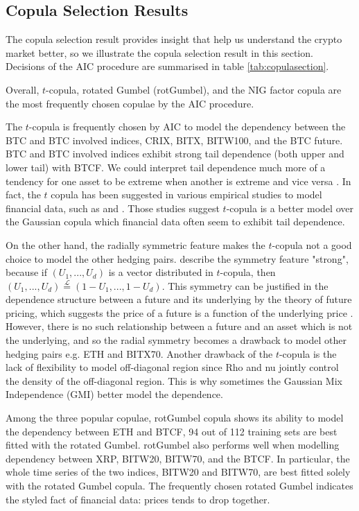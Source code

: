 \subsection{Copula Selection Results}\label{sec: copula results}
The copula selection result provides insight that help us understand the crypto market better, so
we illustrate the copula selection result in this section.
Decisions of the AIC procedure are summarised in table \ref{tab:copulasection}. \medskip

Overall, $t$-copula, rotated Gumbel (rotGumbel), and the NIG factor copula are the most frequently chosen copulae by the AIC procedure. \medskip

The $t$-copula is frequently chosen by AIC to model the dependency between the BTC and BTC involved indices, CRIX, BITX, BITW100, and the BTC future.
BTC and BTC involved indices exhibit strong tail dependence (both upper and lower tail) with BTCF.
We could interpret tail dependence much more of a tendency for one asset to be extreme when another is extreme and vice versa \citep{McNeil2015}.
In fact, the $t$ copula has been suggested in various empirical studies to model financial data, such as \cite{zeevi2002beyond} and \cite{breymann2003dependence}.
Those studies suggest $t$-copula is a better model over the Gaussian copula which financial data often seem to exhibit tail dependence. \medskip

On the other hand, the radially symmetric feature makes the $t$-copula not a good choice to model the other hedging pairs.
\cite{demarta2005t} describe the symmetry feature "strong", because if $(U_1, ..., U_d)$ is a vector distributed in $t$-copula,
then $(U_1, ..., U_d) \overset{\mathcal{L}}= (1-U_1, ..., 1-U_d)$.
This symmetry can be justified in the dependence structure between a future and its underlying by the theory of future pricing,
which suggests the price of a future is a function of the underlying price \citep{hull2003options}.
However, there is no such relationship between a future and an asset which is not the underlying, and so the radial symmetry becomes a drawback to model other hedging pairs e.g. ETH and BITX70.
Another drawback of the $t$-copula is the lack of flexibility to model off-diagonal region since Rho and nu jointly control the density of the off-diagonal region.
This is why sometimes the Gaussian Mix Independence (GMI) better model the dependence.  \medskip

Among the three popular copulae, rotGumbel copula shows its ability to model the dependency between ETH and BTCF,
94 out of 112 training sets are best fitted with the rotated Gumbel.
rotGumbel also performs well when modelling dependency between XRP, BITW20, BITW70, and the BTCF.
In particular, the whole time series of the two indices, BITW20 and BITW70, are best fitted solely with the rotated Gumbel copula.
The frequently chosen rotated Gumbel indicates the styled fact of financial data: prices tends to drop together.  \medskip

